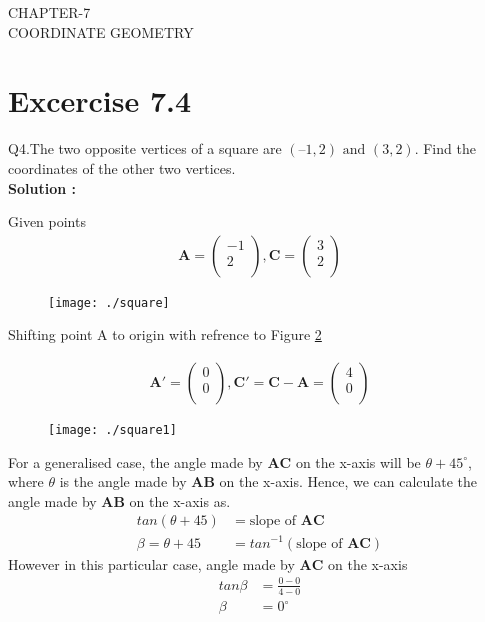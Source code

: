 \documentclass[12pt]{article}
\newcommand{\myvec}[1]{\ensuremath{\begin{pmatrix}#1\end{pmatrix}}}
\let\vec\mathbf
\begin{document}
\begin{center}
\textbf\large{CHAPTER-7 \\ COORDINATE GEOMETRY}

\end{center}
\section*{Excercise 7.4}

Q4.The two opposite vertices of a square are $(–1, 2) \text{ and } (3, 2)$. Find the coordinates of the other two vertices.\\
\textbf{Solution :}

Given points 
\begin{align*}
\vec{A} = \myvec
{
-1 \\
 2\\
},
\vec{C} = 
\myvec
{
3\\
2\\
}
\end{align*}

\begin{figure}[!h]
	\begin{center} 
	    \texttt{[image: ./square]}
	\end{center}
\caption{}
\label{fig:Fig1}
\end{figure}

Shifting point A to origin with refrence to Figure \ref{fig:Fig2}

\begin{align*}
\vec{A'} =
\myvec{
0 \\
0\\
},
\vec{C'} = \vec{C}-\vec{A} = 
\myvec{
4 \\
0\\
}
\end{align*}

\begin{figure}[!h]
	\begin{center} 
	    \texttt{[image: ./square1]}
	\end{center}
\caption{}
\label{fig:Fig2}
\end{figure}

\newpage

For a generalised case, the angle made by $\vec{AC}$ on the x-axis will be $\theta + 45^{\circ}$, where $\theta$ is the angle made by $\vec{AB}$ on the x-axis.
Hence, we can calculate the angle made by $\vec{AB}$ on the x-axis as.
\begin{align*}
tan(\theta+45) &= \text{slope of } \vec{AC}\\
\beta = \theta+45 &= tan^{-1}(\text{slope of } \vec{AC})
\end{align*}
However in this particular case, angle made by $\vec{AC}$ on the x-axis
\begin{align*}
tan\beta &= \frac{0-0}{4-0}\\
\beta &= 0^{\circ}
\end{align*}
\end{document}

